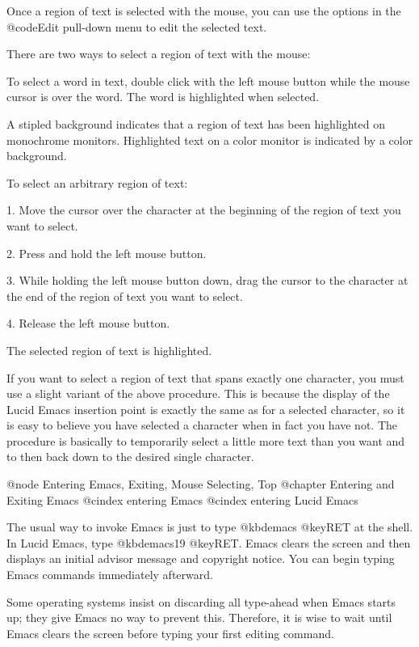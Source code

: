 {{  Once a region of text is selected with the mouse, you can use the options 
in the @code{Edit} pull-down menu to edit the selected text. 

There are two ways to select a region of text with the mouse:

  To select a word in text, double click with the 
left mouse button while the mouse cursor is over the word.
The word is highlighted when selected. 

  A stipled background indicates that a region of text has been highlighted on 
monochrome monitors.  Highlighted text on a color monitor is 
indicated by a color background.  

  To select an arbitrary region of text: 

1.	Move the cursor over the character at the beginning of the region of 
text you want to select.

2.	Press and hold the left mouse button.

3.	While holding the left mouse button down, drag the cursor to the 
character at the end of the region of text you want to select.

4.	Release the left mouse button.

The selected region of text is highlighted.

If you want to select a region of text that spans exactly one character, you 
must use a slight variant of the above procedure. This is because the 
display of the Lucid Emacs insertion point is exactly the same as for a selected 
character, so it is easy to believe you have selected a character when in 
fact you have not. The procedure is basically to temporarily select a little more text than 
you want and to then back down to the desired single character.

@node Entering Emacs, Exiting, Mouse Selecting, Top
@chapter Entering and Exiting Emacs
@cindex entering Emacs
@cindex entering Lucid Emacs

  The usual way to invoke Emacs is just to type @kbd{emacs @key{RET}} at
the shell.  In Lucid Emacs, type @kbd{emacs19 @key{RET}}.  
Emacs clears the screen and then displays an initial advisor
message and copyright notice.  You can begin typing Emacs commands
immediately afterward.

  Some operating systems insist on discarding all type-ahead when Emacs
starts up; they give Emacs no way to prevent this.  Therefore, it is
wise to wait until Emacs clears the screen before typing your first
editing command.

}}
